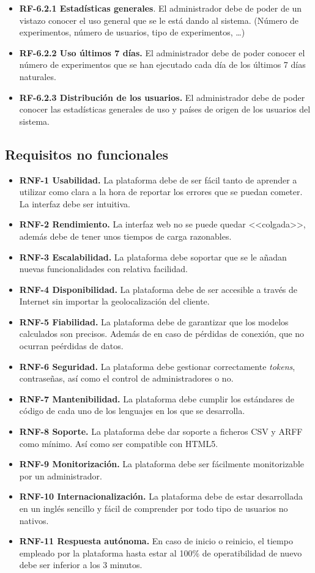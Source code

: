 \begin{itemize}
\begin{itemize}
\begin{itemize}
		\item \textbf{RF-6.2.1 Estadísticas generales}. El administrador debe de poder de un vistazo conocer el uso general que se le está dando al sistema. (Número de experimentos, número de usuarios, tipo de experimentos, \dots)
		\item \textbf{RF-6.2.2 Uso últimos 7 días.} El administrador debe de poder conocer el número de experimentos que se han ejecutado cada día de los últimos 7 días naturales.
		\item \textbf{RF-6.2.3 Distribución de los usuarios.} El administrador debe de poder conocer las estadísticas generales de uso y países de origen de los usuarios del sistema.
	\end{itemize}
	\end{itemize}
\end{itemize}
\pagebreak
\subsection{Requisitos no funcionales}\label{requisitos-no-funcionales}
\begin{itemize}
\item \textbf{RNF-1 Usabilidad.} La plataforma debe de ser fácil tanto de aprender a utilizar como clara a la hora de reportar los errores que se puedan cometer. La interfaz debe ser intuitiva.
\item \textbf{RNF-2 Rendimiento.} La interfaz web no se puede quedar <<colgada>>, además debe de tener unos tiempos de carga razonables.
\item \textbf{RNF-3 Escalabilidad.} La plataforma debe soportar que se le añadan nuevas funcionalidades con relativa facilidad.
\item \textbf{RNF-4 Disponibilidad.} La plataforma debe de ser accesible a través de Internet sin importar la geolocalización del cliente.
\item \textbf{RNF-5 Fiabilidad.} La plataforma debe de garantizar que los modelos calculados son precisos. Además de en caso de pérdidas de conexión, que no ocurran peérdidas de datos.
\item \textbf{RNF-6 Seguridad.} La plataforma debe gestionar correctamente \textit{tokens}, contraseñas, así como el control de administradores o no.
\item \textbf{RNF-7 Mantenibilidad.} La plataforma debe cumplir los estándares de código de cada uno de los lenguajes en los que se desarrolla. 
\item \textbf{RNF-8 Soporte.} La plataforma debe dar soporte a ficheros CSV y ARFF como mínimo. Así como ser compatible con HTML5.
\item \textbf{RNF-9 Monitorización.} La plataforma debe ser fácilmente monitorizable por un administrador.
\item \textbf{RNF-10 Internacionalización.} La plataforma debe de estar desarrollada en un inglés sencillo y fácil de comprender por todo tipo de usuarios no nativos.
\item \textbf{RNF-11 Respuesta autónoma.} En caso de inicio o reinicio, el tiempo empleado por la plataforma hasta estar al 100\% de operatibilidad de nuevo debe ser inferior a los 3 minutos.
\end{itemize}
\newpage
